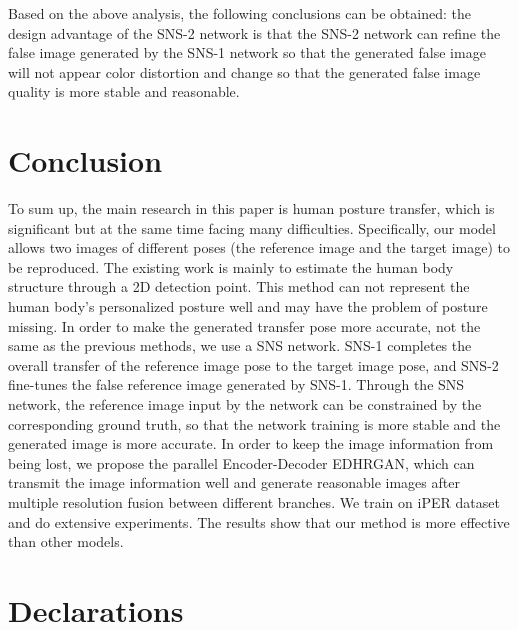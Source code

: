 Based on the above analysis, the following conclusions can be obtained: the design advantage of the SNS-2 network is that the SNS-2 network can refine the false image generated by the SNS-1 network so that the generated false image will not appear color distortion and change so that the generated false image quality is more stable and reasonable.

\section{Conclusion}
To sum up, the main research in this paper is human posture transfer, which is significant but at the same time facing many difficulties. Specifically, our model allows two images of different poses (the reference image and the target image) to be reproduced. The existing work is mainly to estimate the human body structure through a 2D detection point. This method can not represent the human body's personalized posture well and may have the problem of posture missing. In order to make the generated transfer pose more accurate, not the same as the previous methods, we use a SNS network. SNS-1 completes the overall transfer of the reference image pose to the target image pose, and SNS-2 fine-tunes the false reference image generated by SNS-1. Through the SNS network, the reference image input by the network can be constrained by the corresponding ground truth, so that the network training is more stable and the generated image is more accurate. In order to keep the image information from being lost, we propose the parallel Encoder-Decoder EDHRGAN, which can transmit the image information well and generate reasonable images after multiple resolution fusion between different branches. We train on iPER dataset and do extensive experiments. The results show that our method is more effective than other models.
	
	
	
	
	
\section*{Declarations}
